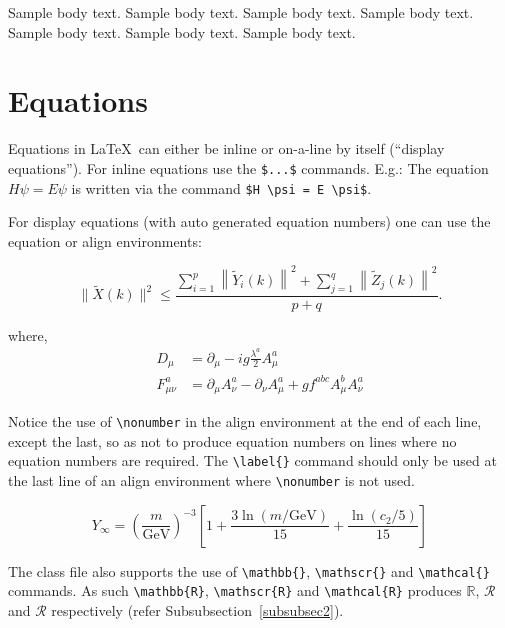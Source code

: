 \documentclass[sn-basic,pdflatex]{sn-jnl}
\theoremstyle{remark}
\theoremstyle{definition}
\begin{document}
Sample body text. Sample body text. Sample body text. Sample body text.
Sample body text. Sample body text. Sample body text.

\section{Equations}\label{sec4}

Equations in \LaTeX~can either be inline or on-a-line by itself
(``display equations''). For inline equations use the \texttt{\$...\$}
commands. E.g.: The equation \(H\psi = E \psi\) is written via the
command \texttt{\$H\ \textbackslash{}psi\ =\ E\ \textbackslash{}psi\$}.

For display equations (with auto generated equation numbers) one can use
the equation or align environments:

\begin{equation}
\|\tilde{X}(k)\|^2 \leq\frac{\sum\limits_{i=1}^{p}\left\|\tilde{Y}_i(k)\right\|^2+\sum\limits_{j=1}^{q}\left\|\tilde{Z}_j(k)\right\|^2 }{p+q}.\label{eq1}
\end{equation}

where, \begin{align}
D_\mu &=  \partial_\mu - ig \frac{\lambda^a}{2} A^a_\mu \nonumber \\
F^a_{\mu\nu} &= \partial_\mu A^a_\nu - \partial_\nu A^a_\mu + g f^{abc} A^b_\mu A^a_\nu \label{eq2}
\end{align}

Notice the use of \texttt{\textbackslash{}nonumber} in the align
environment at the end of each line, except the last, so as not to
produce equation numbers on lines where no equation numbers are
required. The \texttt{\textbackslash{}label\{\}} command should only be
used at the last line of an align environment where
\texttt{\textbackslash{}nonumber} is not used.

\begin{equation}
Y_\infty = \left( \frac{m}{\textrm{GeV}} \right)^{-3}
    \left[ 1 + \frac{3 \ln(m/\textrm{GeV})}{15}
    + \frac{\ln(c_2/5)}{15} \right]
\end{equation}

The class file also supports the use of
\texttt{\textbackslash{}mathbb\{\}},
\texttt{\textbackslash{}mathscr\{\}} and
\texttt{\textbackslash{}mathcal\{\}} commands. As such
\texttt{\textbackslash{}mathbb\{R\}},
\texttt{\textbackslash{}mathscr\{R\}} and
\texttt{\textbackslash{}mathcal\{R\}} produces \(\mathbb{R}\),
\(\mathscr{R}\) and \(\mathcal{R}\) respectively (refer
Subsubsection~\ref{subsubsec2}).
\end{document}
